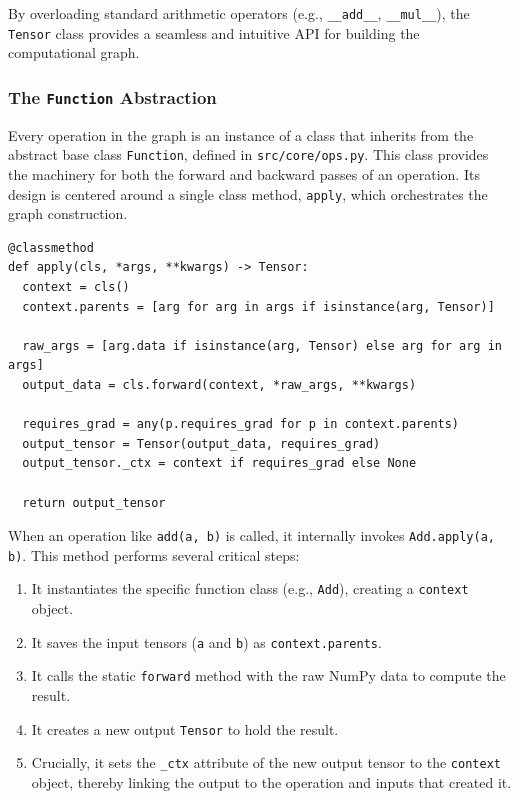 \documentclass[a4paper]{article}
\begin{document}
By overloading standard arithmetic operators (e.g., \texttt{\_\_add\_\_}, \texttt{\_\_mul\_\_}), the \texttt{Tensor} class provides a seamless and intuitive API for building the computational graph.

\subsubsection{The \texttt{Function} Abstraction}

Every operation in the graph is an instance of a class that inherits from the abstract base class \texttt{Function}, defined in \texttt{src/core/ops.py}. This class provides the machinery for both the forward and backward passes of an operation. Its design is centered around a single class method, \texttt{apply}, which orchestrates the graph construction.

\begin{lstlisting}[caption={The \texttt{Function.apply} method orchestrates graph construction.}, label={lst:function_apply}]
@classmethod
def apply(cls, *args, **kwargs) -> Tensor:
  context = cls()
  context.parents = [arg for arg in args if isinstance(arg, Tensor)]
  
  raw_args = [arg.data if isinstance(arg, Tensor) else arg for arg in args]
  output_data = cls.forward(context, *raw_args, **kwargs)
  
  requires_grad = any(p.requires_grad for p in context.parents)
  output_tensor = Tensor(output_data, requires_grad)
  output_tensor._ctx = context if requires_grad else None
  
  return output_tensor
\end{lstlisting}

When an operation like \texttt{add(a, b)} is called, it internally invokes \texttt{Add.apply(a, b)}. This method performs several critical steps:
\begin{enumerate}
    \item It instantiates the specific function class (e.g., \texttt{Add}), creating a \texttt{context} object.
    \item It saves the input tensors (\texttt{a} and \texttt{b}) as \texttt{context.parents}.
    \item It calls the static \texttt{forward} method with the raw NumPy data to compute the result.
    \item It creates a new output \texttt{Tensor} to hold the result.
    \item Crucially, it sets the \texttt{\_ctx} attribute of the new output tensor to the \texttt{context} object, thereby linking the output to the operation and inputs that created it.
\end{enumerate}
\end{document}
